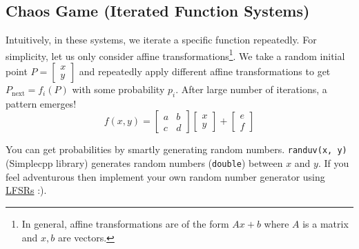 \documentclass[../../Problems]{subfiles}
\begin{document}
\recalctypearea
\subsection{Chaos Game (Iterated Function Systems)}
Intuitively, in these systems, we iterate a specific function repeatedly. For simplicity, let us only consider affine transformations\footnote{In general, affine transformations are of the form $Ax+b$ where $A$ is a matrix and $x,b$ are vectors.}. We take a random initial point $P=\begin{bmatrix}x\\y\end{bmatrix}$ and repeatedly apply different affine transformations to get $P_{\text{next}}=f_i(P)$ with some probability $p_i$. After large number of iterations, a pattern emerges!
\begin{equation}
	f(x,y)={\begin{bmatrix}a&b\\c&d\end{bmatrix}}{\begin{bmatrix}x\\y\end{bmatrix}}+{\begin{bmatrix}e\\f\end{bmatrix}}
\end{equation}
\begin{note}
	You can get probabilities by smartly generating random numbers. \verb!randuv(x, y)! (Simplecpp library) generates random numbers (\verb!double!) between $x$ and $y$. If you feel adventurous then implement your own random number generator using \hyperref[pp:linearfeedbackshiftregister]{LFSRs} :).
\end{note}
\end{document}
